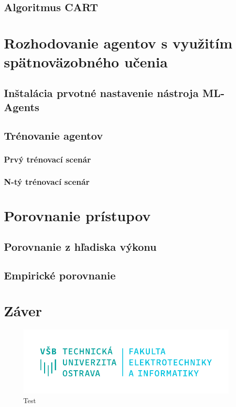 \documentclass[slovak, master]{diploma}
\begin{document}
\section{Algoritmus CART}
\label{sec:CART}

\chapter{Rozhodovanie agentov s využitím spätnoväzobného učenia}
\label{sec:ImplReinforcementLearningMLAgent}
\section{Inštalácia prvotné nastavenie nástroja ML-Agents}
\label{sec:MLAgentsInstall}
\section{Trénovanie agentov}
\label{sec:Training}
\subsection{Prvý trénovací scenár}
\label{sec:FirstScenario}
\subsection{N-tý trénovací scenár}
\label{sec:LastScenario}

\chapter{Porovnanie prístupov}
\label{sec:ImplReinforcement learning}
\section{Porovnanie z hľadiska výkonu}
\label{sec:Performance}
\section{Empirické porovnanie}
\label{sec:Gameplay}

\chapter{Záver}
\label{sec:Conclusion}

\begin{figure}[!htbp]
	\centering
	\includegraphics[width=.5\textwidth]{Figures/FEI_CZ.pdf}
	\caption{Test}
	\label{pic:Teeest}
\end{figure}
\end{document}
